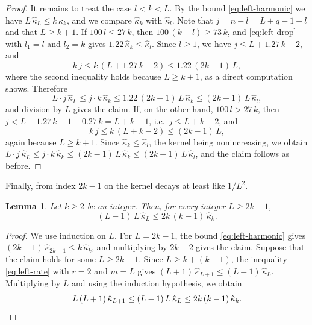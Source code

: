 \documentclass{amsart}
\makeatletter
\newtheorem{lemma}[theorem]{Lemma}
\theoremstyle{definition}
\theoremstyle{remark}
\numberwithin{equation}{section}
\def\subsection{\@startsection{subsection}{2}\z@{.5\linespacing\@plus.7\linespacing}{-.5em}{\normalfont\bfseries\boldmath}}
\makeatother
\begin{document}
\begin{proof}
It remains to treat the case $l<k<L$. By the bound \eqref{eq:left-harmonic} we have $L\,\hat\kappa_L\le k\,\hat\kappa_k$, and we compare $\hat\kappa_k$ with $\hat\kappa_l$. Note that $j=n-l=L+q-1-l$ and that $L\ge k+1$. If $100\,l\le 27\,k$, then $100\,(k-l)\ge 73\,k$, and \eqref{eq:left-drop} with $l_1=l$ and $l_2=k$ gives $1.22\,\hat\kappa_k\le\hat\kappa_l$. Since $l\ge 1$, we have $j\le L+1.27\,k-2$, and
\[
k\,j\le k\,(L+1.27\,k-2)\le 1.22\,(2k-1)\,L ,
\]
where the second inequality holds because $L\ge k+1$, as a direct computation shows. Therefore
\[
L\cdot j\,\hat\kappa_L\le j\cdot k\,\hat\kappa_k\le 1.22\,(2k-1)\,L\,\hat\kappa_k\le(2k-1)\,L\,\hat\kappa_l ,
\]
and division by $L$ gives the claim. If, on the other hand, $100\,l>27\,k$, then $j<L+1.27\,k-1-0.27\,k=L+k-1$, i.e.\ $j\le L+k-2$, and
\[
k\,j\le k\,(L+k-2)\le(2k-1)\,L ,
\]
again because $L\ge k+1$. Since $\hat\kappa_k\le\hat\kappa_l$, the kernel being nonincreasing, we obtain $L\cdot j\,\hat\kappa_L\le j\cdot k\,\hat\kappa_k\le(2k-1)\,L\,\hat\kappa_k\le(2k-1)\,L\,\hat\kappa_l$, and the claim follows as before.
\end{proof}

Finally, from index $2k-1$ on the kernel decays at least like $1/L^2$.

\begin{lemma}\label{lem:quadraticdecay}
Let $k\ge 2$ be an integer. Then, for every integer $L\ge 2k-1$,
\[
(L-1)\,L\,\hat\kappa_L\le 2k\,(k-1)\,\hat\kappa_k .
\]
\end{lemma}

\begin{proof}
We use induction on $L$. For $L=2k-1$, the bound \eqref{eq:left-harmonic} gives $(2k-1)\,\hat\kappa_{2k-1}\le k\,\hat\kappa_k$, and multiplying by $2k-2$ gives the claim. Suppose that the claim holds for some $L\ge 2k-1$. Since $L\ge k+(k-1)$, the inequality \eqref{eq:left-rate} with $r=2$ and $m=L$ gives $(L+1)\,\hat\kappa_{L+1}\le(L-1)\,\hat\kappa_L$. Multiplying by $L$ and using the induction hypothesis, we obtain
\[
L\,(L+1)\,\hat\kappa_{L+1}\le(L-1)\,L\,\hat\kappa_L\le 2k\,(k-1)\,\hat\kappa_k .\qedhere
\]
\end{proof}

\subsection{Columns $k\ge 82$}\label{subsec:left-induction}
\end{document}
